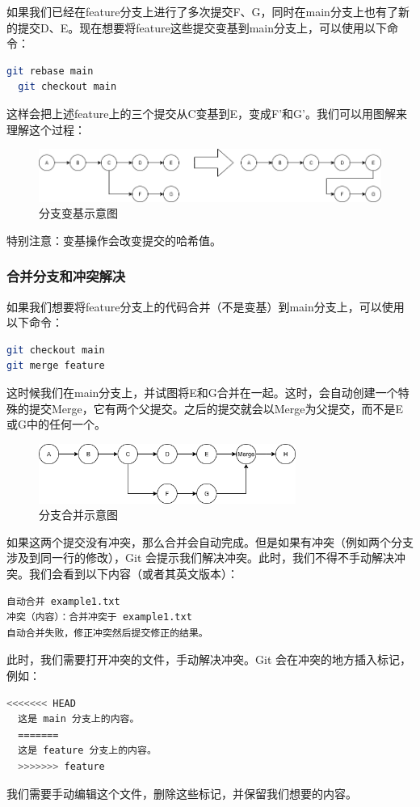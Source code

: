 \documentclass[../main.tex]{subfiles}
\begin{document}
如果我们已经在feature分支上进行了多次提交F、G，同时在main分支上也有了新的提交D、E。现在想要将feature这些提交变基到main分支上，可以使用以下命令：
\begin{lstlisting}[language=bash]
  git rebase main
  git checkout main
\end{lstlisting}
这样会把上述feature上的三个提交从C变基到E，变成F'和G'。我们可以用图解来理解这个过程：

\begin{figure}[htbp]
\centering
\includegraphics[width=\textwidth]{images/git-rebase.png}
\caption{分支变基示意图}
\label{fig:git-rebase}
\end{figure}

特别注意：变基操作会改变提交的哈希值。

\subsubsection{合并分支和冲突解决}

如果我们想要将feature分支上的代码合并（不是变基）到main分支上，可以使用以下命令：

\begin{lstlisting}[language=bash]
git checkout main
git merge feature
\end{lstlisting}

这时候我们在main分支上，并试图将E和G合并在一起。这时，会自动创建一个特殊的提交Merge，它有两个父提交。之后的提交就会以Merge为父提交，而不是E或G中的任何一个。

\begin{figure}[htbp]
\centering
\includegraphics[width=0.75\textwidth]{images/git-merge.png}
\caption{分支合并示意图}
\label{fig:git-merge}
\end{figure}

如果这两个提交没有冲突，那么合并会自动完成。但是如果有冲突（例如两个分支涉及到同一行的修改），Git 会提示我们解决冲突。此时，我们不得不手动解决冲突。我们会看到以下内容（或者其英文版本）：
\begin{lstlisting}[language=bash]
  自动合并 example1.txt
冲突（内容）：合并冲突于 example1.txt
自动合并失败，修正冲突然后提交修正的结果。
\end{lstlisting}
此时，我们需要打开冲突的文件，手动解决冲突。Git 会在冲突的地方插入标记，例如：
\begin{lstlisting}[language=bash]
  <<<<<<< HEAD
  这是 main 分支上的内容。
  =======
  这是 feature 分支上的内容。
  >>>>>>> feature
\end{lstlisting}
我们需要手动编辑这个文件，删除这些标记，并保留我们想要的内容。
\end{document}
